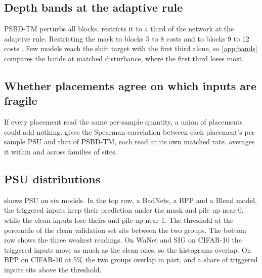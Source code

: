 \subsection{Depth bands at the adaptive rule}
\label{sec:results:depth}

PSBD-TM perturbs all \VitBlocks{} blocks.  restricts it to a third of the network at the adaptive rule. Restricting the mask to blocks 5 to 8 costs \StaircaseBandsBeforeAttentionNormBlocksFiveEightTokenMaskGain{} and to blocks 9 to 12 costs \StaircaseBandsBeforeAttentionNormBlocksNineOneTwoTokenMaskGain{}. Few models reach the shift target with the first third alone, so \cref{app:bands} compares the bands at matched disturbance, where the first third loses most.


\FloatBarrier

\subsection{Whether placements agree on which inputs are fragile}
\label{app:agreement}

If every placement read the same per-sample quantity, a union of placements could add nothing.  gives the Spearman correlation between each placement's per-sample PSU and that of PSBD-TM, each read at its own matched rate.  averages it within and across families of sites.



\FloatBarrier

\subsection{PSU distributions}
\label{app:distributions}

 shows PSU on six models. In the top row, a BadNets, a BPP and a Blend model, the triggered inputs keep their prediction under the mask and pile up near 0, while the clean inputs lose theirs and pile up near 1. The threshold at the \HeadlineQuantilePercent{} percentile of the clean validation set sits between the two groups. The bottom row shows the three weakest readings. On WaNet and SIG on CIFAR-10 the triggered inputs move as much as the clean ones, so the histograms overlap. On BPP on CIFAR-10 at 5\% the two groups overlap in part, and a share of triggered inputs sits above the threshold.

